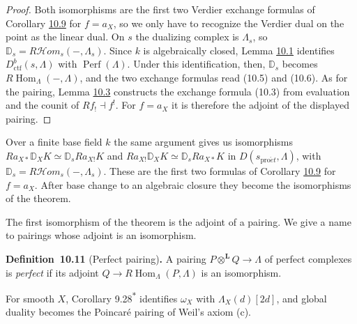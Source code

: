 \documentclass[11pt]{article}
\newenvironment{bpstatement}[2]{\par\addvspace{0.6\baselineskip}\noindent\textbf{#1}#2\textbf{.}\enspace\ignorespaces}
  {\par\addvspace{0.4\baselineskip}}
\newcommand{\bpout}[1]{#1\textsuperscript{\hyperlink{bp-outside}{\ensuremath{\ast}}}}
\providecommand{\cHom}{}\renewcommand{\cHom}{R\mathcal{H}\!om}
\begin{document}
\begin{proof}[{Proof}]\label{bp33}%
Both isomorphisms are the first two Verdier exchange formulas of Corollary \hyperref[bp28]{10.9} for \(f=a_X\), so we only have to recognize the Verdier dual on the point as the linear dual. On \(s\) the dualizing complex is \(\Lambda_s\), so \(\mathbb D_s=\cHom_s(-,\Lambda_s)\). Since \(k\) is algebraically closed, Lemma \hyperref[bp5]{10.1} identifies \(D^b_{\mathrm{ctf}}(s,\Lambda)\) with \(\operatorname{Perf}(\Lambda)\). Under this identification, then, \(\mathbb D_s\) becomes \(R\!\operatorname{Hom}_\Lambda(-,\Lambda)\), and the two exchange formulas read (10.5) and (10.6). As for the pairing, Lemma \hyperref[bp10]{10.3} constructs the exchange formula (10.3) from evaluation and the counit of \(Rf_!\dashv f^!\). For \(f=a_X\) it is therefore the adjoint of the displayed pairing.
\end{proof}

\label{bp34}%
Over a finite base field \(k\) the same argument gives us isomorphisms \(Ra_{X*}\mathbb D_XK\simeq\mathbb D_sRa_{X!}K\) and \(Ra_{X!}\mathbb D_XK\simeq\mathbb D_sRa_{X*}K\) in \(D(s_{\mathrm{pro}\acute{e}t},\Lambda)\), with \(\mathbb D_s=\cHom_s(-,\Lambda_s)\). These are the first two formulas of Corollary \hyperref[bp28]{10.9} for \(f=a_X\). After base change to an algebraic closure they become the isomorphisms of the theorem.

The first isomorphism of the theorem is the adjoint of a pairing. We give a name to pairings whose adjoint is an isomorphism.

\label{bp35}%
\begin{bpstatement}{Definition~10.11}{ (Perfect pairing)}
A pairing \(P\otimes^{\mathbf L}Q\to\Lambda\) of perfect complexes is \emph{perfect} if its adjoint \(Q\to R\!\operatorname{Hom}_\Lambda(P,\Lambda)\) is an isomorphism.
\end{bpstatement}

\label{bp36}%
For smooth \(X\), Corollary \bpout{9.28} identifies \(\omega_X\) with \(\Lambda_X(d)[2d]\), and global duality becomes the Poincaré pairing of Weil's axiom (c).
\end{document}

